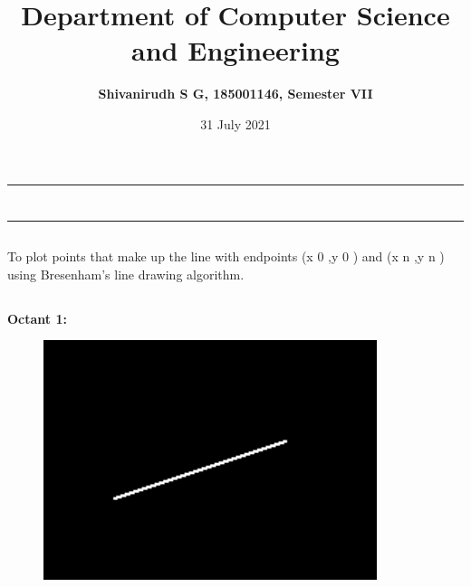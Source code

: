 \documentclass[12pt,letterpaper]{article}
\title{\textbf{Department of Computer Science and Engineering}}
\author{\textbf{Shivanirudh S G, 185001146, Semester VII }}
\date{31 July 2021}
\begin{document}
\maketitle
\hrule
\section*{}
\hrule 
\bigskip\bigskip

\subsection*{}

\subsection*{}
\begin{flushleft}
    To plot points that make up the line with endpoints (x 0 ,y 0 ) and (x n ,y n ) using Bresenham’s line drawing algorithm.  
\end{flushleft}

\subsection*{}
\begin{flushleft}




\end{flushleft}
\newpage
\subsection*{}
\textbf{Octant 1:}
\begin{figure}[h]
    \centering
    \includegraphics[height=7cm]{Outputs/O1.png}
\end{figure}
\end{document}
